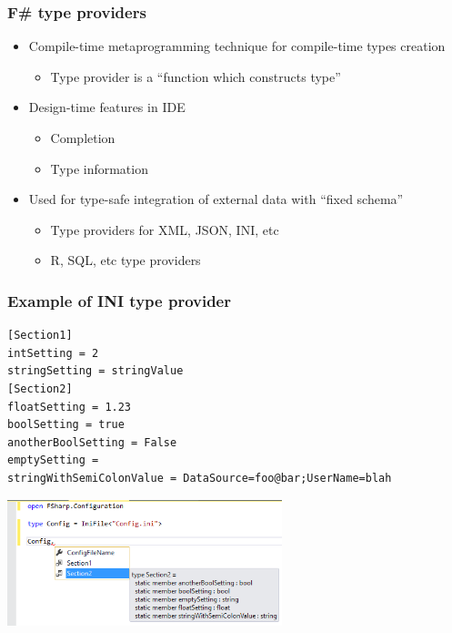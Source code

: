 \documentclass[xcolor=table]{beamer}
\begin{document}
\begin{frame}
  \transwipe[direction=90]
  \frametitle{F\# type providers}
\begin{itemize}
 \item Compile-time metaprogramming technique for compile-time types creation
 \begin{itemize}
  \item Type provider is a ``function which constructs type''
 \end{itemize}
 \item Design-time features in IDE
 \begin{itemize}
   \item Completion
   \item Type information
 \end{itemize}
 \item Used for type-safe integration of external data with ``fixed schema''
 \begin{itemize}
   \item Type providers for XML, JSON, INI, etc
   \item R, SQL, etc type providers
 \end{itemize}
\end{itemize}

\end{frame}


\begin{frame}[fragile]
  \transwipe[direction=90]
  \frametitle{Example of INI type provider}

\small{
\begin{verbatim}
[Section1]
intSetting = 2
stringSetting = stringValue
[Section2]
floatSetting = 1.23
boolSetting = true
anotherBoolSetting = False
emptySetting =
stringWithSemiColonValue = DataSource=foo@bar;UserName=blah 
\end{verbatim}
}
\includegraphics[width=0.6\textwidth]{pictures/INIExample.png}

\end{frame}
\end{document}
